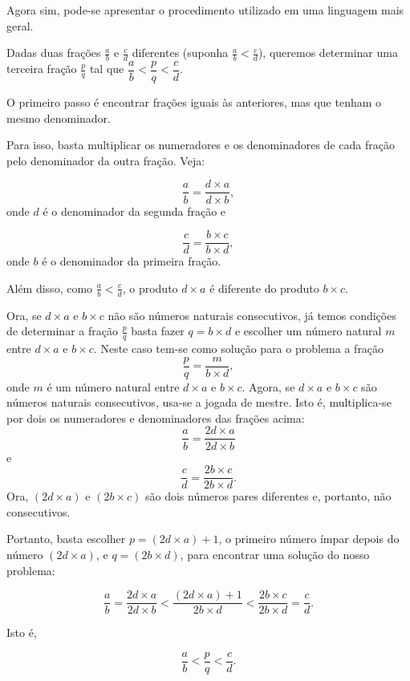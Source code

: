 \begin{refletindo*}[breakable]{}{}
  Agora sim, pode-se apresentar o procedimento utilizado em uma linguagem mais geral.  
  
  Dadas duas frações   $\frac{a}{b}$ e   $\frac{c}{d}$ diferentes (suponha   $\frac{a}{b}<\frac{c}{d}$), queremos determinar uma terceira fração   $\frac{p}{q}$ tal que   $\dfrac{a}{b}<\dfrac{p}{q}<\dfrac{c}{d}$.  
  
  O primeiro passo é encontrar frações iguais às anteriores, mas que tenham o mesmo denominador.  
  
  Para isso, basta multiplicar os numeradores e os denominadores de cada fração pelo denominador da outra fração. Veja:  
  
  $$\dfrac{a}{b} = \dfrac{d \times a}{d \times b},$$
  onde   $d$ é o denominador da segunda fração e  
  
  $$\dfrac{c}{d} = \dfrac{b \times c}{b \times d},$$
  onde   $b$ é o denominador da primeira fração.  
  
  Além disso, como   $\frac{a}{b}<\frac{c}{d}$, o produto   $d \times a$ é diferente do produto   $b \times c$.  
  
  Ora, se   $d \times a$ e   $b \times c$ não são números naturais consecutivos, já temos condições de determinar a fração   $\frac{p}{q}$ basta fazer   $q = b \times d$ e escolher um número natural   $m$ entre   $d \times a$ e   $b \times c$. Neste caso tem-se como solução para o problema a fração  
  $$\dfrac{p}{q} = \dfrac{m}{b \times d},$$ 
  onde   $m$ é um número natural entre   $d \times a$ e   $b \times c$.  
  Agora, se   $d \times a$ e   $b \times c$ são números naturais consecutivos, usa-se a jogada de mestre. Isto é, multiplica-se por dois os numeradores e denominadores das frações acima:  
  $$\dfrac{a}{b} = \dfrac{2d \times a}{2d \times b}$$
  e  
  $$\dfrac{c}{d} = \dfrac{2b \times c}{2b \times d}.$$
  Ora,   $(2d \times a)$ e $(2b \times c)$ são dois números pares diferentes e, portanto, não consecutivos.   
  
  Portanto, basta escolher   $p = (2d \times a) + 1$, o primeiro número ímpar depois do número    $(2d \times a)$,  e   $q=(2b \times d)$, para encontrar uma solução do nosso problema:  
  
  $$\dfrac{a}{b} = \dfrac{2d \times a}{2d \times b} < \dfrac{(2d \times a) + 1}{2b \times d} <  \dfrac{2b \times c}{2b \times d} = \dfrac{c}{d}.$$
  
  Isto é,   
  
  $$\dfrac{a}{b} < \dfrac{p}{q} < \dfrac{c}{d}.$$
  
\end{refletindo*}


